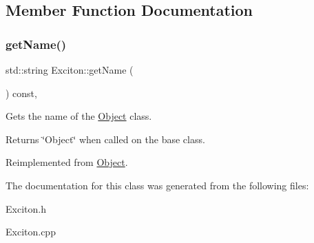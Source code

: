 \subsection{Member Function Documentation}
\mbox{\label{class_exciton_a4db43bd7ca4136e35f9a50b2a5854728}} 
\subsubsection{\texorpdfstring{get\+Name()}{getName()}}
{\footnotesize\ttfamily std\+::string Exciton\+::get\+Name (\begin{DoxyParamCaption}{ }\end{DoxyParamCaption}) const\hspace{0.3cm}{\ttfamily [inline]}, {\ttfamily [virtual]}}



Gets the name of the \hyperlink{class_object}{Object} class. 

\begin{DoxyReturn}{Returns}
\char`\"{}\+Object\char`\"{} when called on the base class. 
\end{DoxyReturn}


Reimplemented from \hyperlink{class_object_ade517616d51cd9ab581ec5afeb37b313}{Object}.



The documentation for this class was generated from the following files\+:\begin{DoxyCompactItemize}
\item 
Exciton.\+h\item 
Exciton.\+cpp\end{DoxyCompactItemize}
